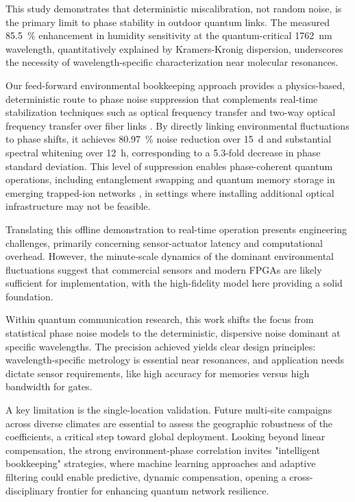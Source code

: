 \documentclass[aps,pra,reprint,groupedaddress,twocolumn,superscriptaddress]{revtex4-2}
\begin{document}
This study demonstrates that deterministic miscalibration, not random noise, is the primary limit to phase stability in outdoor quantum links. The measured \SI{85.5}{\percent} enhancement in humidity sensitivity at the quantum-critical \SI{1762}{\nano\meter} wavelength, quantitatively explained by Kramers-Kronig dispersion, underscores the necessity of wavelength-specific characterization near molecular resonances.

Our feed-forward environmental bookkeeping approach provides a physics-based, deterministic route to phase noise suppression that complements real-time stabilization techniques such as optical frequency transfer \cite{predehl2012920} and two-way optical frequency transfer over fiber links \cite{droste2013optical, williams2008high}. By directly linking environmental fluctuations to phase shifts, it achieves \SI{80.97}{\percent} noise reduction over \SI{15}{\day} and substantial spectral whitening over \SI{12}{\hour}, corresponding to a 5.3-fold decrease in phase standard deviation. This level of suppression enables phase-coherent quantum operations, including entanglement swapping and quantum memory storage in emerging trapped-ion networks \cite{nichol2022elementary,o2024fast}, in settings where installing additional optical infrastructure may not be feasible.

Translating this offline demonstration to real-time operation presents engineering challenges, primarily concerning sensor-actuator latency and computational overhead. However, the minute-scale dynamics of the dominant environmental fluctuations suggest that commercial sensors and modern FPGAs are likely sufficient for implementation, with the high-fidelity model here providing a solid foundation.

Within quantum communication research, this work shifts the focus from statistical phase noise models to the deterministic, dispersive noise dominant at specific wavelengths. The precision achieved yields clear design principles: wavelength-specific metrology is essential near resonances, and application needs dictate sensor requirements, like high accuracy for memories versus high bandwidth for gates.

A key limitation is the single-location validation. Future multi-site campaigns across diverse climates are essential to assess the geographic robustness of the coefficients, a critical step toward global deployment. Looking beyond linear compensation, the strong environment-phase correlation invites "intelligent bookkeeping" strategies, where machine learning approaches \cite{carleo2019machine} and adaptive filtering could enable predictive, dynamic compensation, opening a cross-disciplinary frontier for enhancing quantum network resilience.
\end{document}
